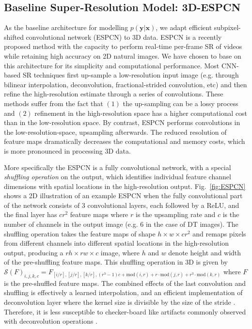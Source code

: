 \subsection{Baseline Super-Resolution Model: 3D-ESPCN} \label{sec:baseline}
As the baseline architecture for modelling $p(\mathbf{y}|\mathbf{x})$, we adapt efficient subpixel-shifted convolutional network (ESPCN) \cite{shi2016real} to 3D data. ESPCN is a recently proposed method with the capacity to perform real-time per-frame SR of videos while retaining high accuracy on 2D natural images.  We have chosen to base on this architecture for its simplicity and computational performance. Most CNN-based SR techniques first up-sample a low-resolution input image (e.g. through bilinear interpolation\cite{dong2016image}, deconvolution\cite{oktay2016multi,mcdonagh2017context}, fractional-strided convolution\cite{johnson2016perceptual}, etc) and then refine the high-resolution estimate through a series of convolutions. These methods suffer from the fact that $(1)$ the up-sampling can be a lossy process and $(2)$ refinement in the high-resolution space has a higher computational cost than in the low-resolution space. By contrast, ESPCN performs convolutions in the low-resolution-space, upsampling afterwards. The reduced resolution of feature maps dramatically decreases the computational and memory costs, which is more pronounced in processing 3D data.

More specifically the ESPCN is a fully convolutional network, with a special \emph{shuffling operation} on the output, which identifies individual feature channel dimensions with spatial locations in the high-resolution output. Fig.~\ref{fig:ESPCN} shows a 2D illustration of an example ESPCN when the fully convolutional part of the network consists of 3 convolutional layers, each followed by a ReLU, and the final layer has $cr^2$ feature maps where $r$ is the upsampling rate and $c$ is the number of channels in the output image (e.g. $6$ in the case of DT images). The shuffling operation takes the feature maps of shape $h\times w\times cr^2$ and remaps pixels from different channels into different spatial locations in the high-resolution output, producing a $rh\times rw\times c$ image, where $h$ and $w$ denote height and width of the pre-shuffling feature maps. This shuffling operation in 3D is given by $\mathcal{S}(F)_{i,j,k,c} =  F_{[i/r],[j/r],[k/r],(r^3-1)c + \text{mod}(i,r) + r\cdot \text{mod}(j,r) + r^3\cdot \text{mod}(k,r)}$ where $F$ is the pre-shuffled feature maps. The combined effects of the last convolution and shuffling is effectively a learned interpolation, and an efficient implementation of deconvolution layer \cite{zeiler2011adaptive} where the kernel size is divisible by the size of the stride \cite{shi2016real}. Therefore, it is less susceptible to checker-board like artifacts commonly observed with deconvolution operations \cite{odena2016deconvolution}.


